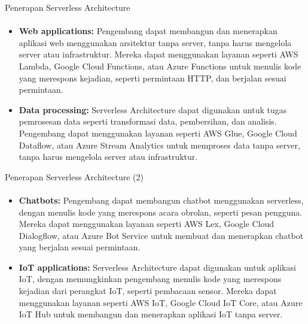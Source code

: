 \documentclass[aspectratio=169, table]{beamer}
\begin{document}
	\begin{frame}{Penerapan Serverless Architecture}
		\framesubtitle{\hspace{1cm}}
		\begin{itemize}
			\item \textbf{Web applications:} Pengembang dapat membangun dan menerapkan aplikasi web menggunakan arsitektur tanpa server, tanpa harus mengelola server atau infrastruktur. Mereka dapat menggunakan layanan seperti AWS Lambda, Google Cloud Functions, atau Azure Functions untuk menulis kode yang merespons kejadian, seperti permintaan HTTP, dan berjalan sesuai permintaan.
			\item \textbf{Data processing:} Serverless Architecture dapat digunakan untuk tugas pemrosesan data seperti transformasi data, pembersihan, dan analisis. Pengembang dapat menggunakan layanan seperti AWS Glue, Google Cloud Dataflow, atau Azure Stream Analytics untuk memproses data tanpa server, tanpa harus mengelola server atau infrastruktur.
		
		\end{itemize}
	\end{frame}
	
	
	\begin{frame}{Penerapan Serverless Architecture (2)}
		\framesubtitle{\hspace{1cm}}
		\begin{itemize}
			\item \textbf{Chatbots:} Pengembang dapat membangun chatbot menggunakan serverless, dengan menulis kode yang merespons acara obrolan, seperti pesan pengguna. Mereka dapat menggunakan layanan seperti AWS Lex, Google Cloud Dialogflow, atau Azure Bot Service untuk membuat dan menerapkan chatbot yang berjalan sesuai permintaan.
			\item \textbf {IoT applications:} Serverless Architecture dapat digunakan untuk aplikasi IoT, dengan memungkinkan pengembang menulis kode yang merespons kejadian dari perangkat IoT, seperti pembacaan sensor. Mereka dapat menggunakan layanan seperti AWS IoT, Google Cloud IoT Core, atau Azure IoT Hub untuk membangun dan menerapkan aplikasi IoT tanpa server.
		\end{itemize}
	\end{frame}
\end{document}

